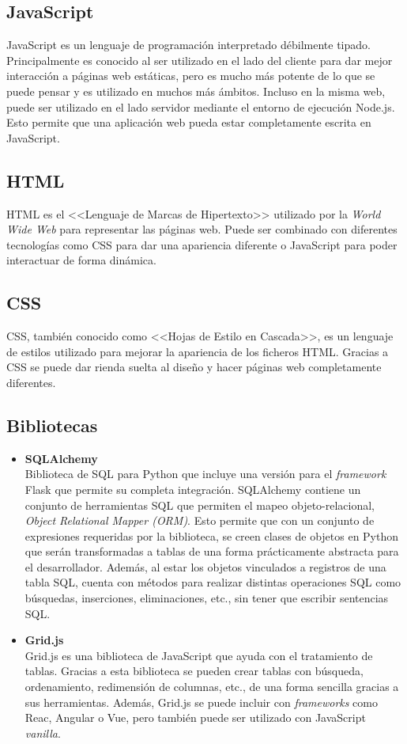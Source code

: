 \subsection{JavaScript}
JavaScript es un lenguaje de programación interpretado débilmente tipado. Principalmente es conocido al ser utilizado en el lado del cliente para dar mejor interacción a páginas web estáticas, pero es mucho más potente de lo que se puede pensar y es utilizado en muchos más ámbitos. Incluso en la misma web, puede ser utilizado en el lado servidor mediante el entorno de ejecución Node.js. Esto permite que una aplicación web pueda estar completamente escrita en JavaScript.\cite{javascript}

\subsection{HTML}
HTML es el <<Lenguaje de Marcas de Hipertexto>> utilizado por la \textit{World Wide Web} para representar las páginas web. Puede ser combinado con diferentes tecnologías como CSS para dar una apariencia diferente o JavaScript para poder interactuar de forma dinámica.

\subsection{CSS}
CSS, también conocido como <<Hojas de Estilo en Cascada>>, es un lenguaje de estilos utilizado para mejorar la apariencia de los ficheros HTML. Gracias a CSS se puede dar rienda suelta al diseño y hacer páginas web completamente diferentes.

\subsection{Bibliotecas}
\begin{itemize}
\item\textbf{SQLAlchemy}\\
Biblioteca de SQL para Python que incluye una versión para el \textit{framework} Flask que permite su completa integración. SQLAlchemy contiene un conjunto de herramientas SQL que permiten el mapeo objeto-relacional, \textit{Object Relational Mapper (ORM)}. Esto permite que con un conjunto de expresiones requeridas por la biblioteca, se creen clases de objetos en Python que serán transformadas a tablas de una forma prácticamente abstracta para el desarrollador. Además, al estar los objetos vinculados a registros de una tabla SQL, cuenta con métodos para realizar distintas operaciones SQL como búsquedas, inserciones, eliminaciones, etc., sin tener que escribir sentencias SQL.\cite{sqlAlchemy}

\item\textbf{Grid.js}\\
Grid.js es una biblioteca de JavaScript que ayuda con el tratamiento de tablas. Gracias a esta biblioteca se pueden crear tablas con búsqueda, ordenamiento, redimensión de columnas, etc., de una forma sencilla gracias a sus herramientas. Además, Grid.js se puede incluir con \textit{frameworks} como Reac, Angular o Vue, pero también puede ser utilizado con JavaScript \textit{vanilla}.
\end{itemize}

